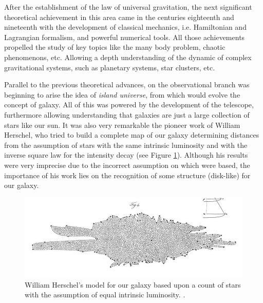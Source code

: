 After the establishment of the law of universal gravitation, the next 
significant theo\-retical achievement in this area came in the centuries 
eighteenth and nineteenth with the development of classical mechanics, i.e.
Hamiltonian and Lagrangian formalism, and powerful numerical tools. All
those achievements propelled the study of key topics like the many body 
problem, chaotic phenomenons, etc. Allowing a depth understanding of the 
dynamic of complex gravitational systems, such as planetary systems, star 
clusters, etc. 


Parallel to the previous theoretical advances, on the observational branch 
was beginning to arise the idea of \textit{island universe}, from which 
would evolve the concept of galaxy. All of this was powered by the 
development of the telescope, furthermore allowing understanding that  
galaxies are just a large collection of stars like our sun. It was also 
very remarkable the pioneer work of William Herschel, who tried to build a
complete map of our galaxy determining distances from the assumption of 
stars with the same intrinsic luminosity and with the inverse square law 
for the intensity decay (see Figure \ref{fig:HerschelModel}). 
Although his results were very imprecise due to the incorrect assumption 
on which were based, the importance of his work lies on the recognition of 
some structure (disk-like) for our galaxy. 


\begin{figure}[htbp]
	\centering
	\includegraphics[width=1.0\textwidth]
	{./figures/1_introduction/Herschel_Model.png}
	
	\caption{\small{William Herschel's model for our galaxy based upon a 
	count of stars with the assumption of equal intrinsic luminosity.
	\cite{Herschel1785}.}}
	
	\label{fig:HerschelModel}
\end{figure}
\newpage

